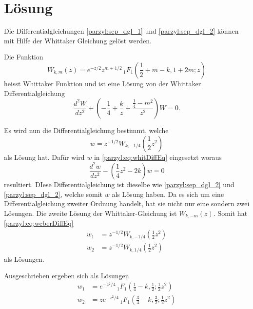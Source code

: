 %
%
%
\section{Lösung
\label{parzyl:section:teil1}}
Die Differentialgleichungen \eqref{parzyl:sep_dgl_1} und \eqref{parzyl:sep_dgl_2} können mit
Hilfe der Whittaker Gleichung gelöst werden.
\begin{definition}
    Die Funktion 
    \begin{equation*}
        W_{k,m}(z) = 
    e^{-z/2} z^{m+1/2} \,
    {}_{1} F_{1}
    (
        {\textstyle \frac{1}{2}} 
        + m - k, 1 + 2m; z)
    \end{equation*}
    heisst Whittaker Funktion und ist eine Lösung
    von der Whittaker Differentialgleichung
    \begin{equation}
        \frac{d^2W}{d z^2} +
        \left(-\frac{1}{4}  + \frac{k}{z} + \frac{\frac{1}{4} - m^2}{z^2} \right) W = 0.
        \label{parzyl:eq:whitDiffEq}
    \end{equation}
\end{definition}
Es wird nun die Differentialgleichung bestimmt, welche
\begin{equation}
    w = z^{-1/2} W_{k,-1/4} \left({\textstyle \frac{1}{2}} z^2\right)
\end{equation}
als Lösung hat.
Dafür wird $w$ in \eqref{parzyl:eq:whitDiffEq} eingesetzt woraus
\begin{equation}
    \frac{d^2 w}{dz^2} - \left(\frac{1}{4} z^2 - 2k\right) w = 0
\label{parzyl:eq:weberDiffEq}
\end{equation}
resultiert. DIese Differentialgleichung ist dieselbe wie 
\eqref{parzyl:sep_dgl_2} und \eqref{parzyl:sep_dgl_2}, welche somit
$w$ als Lösung haben.
Da es sich um eine Differentialgleichung zweiter Ordnung handelt, hat sie nicht nur
eine sondern zwei Lösungen.
Die zweite Lösung der Whittaker-Gleichung ist $W_{k,-m} (z)$.
Somit hat \eqref{parzyl:eq:weberDiffEq}
\begin{align}
    w_1 & = z^{-1/2} W_{k,-1/4} \left({\textstyle \frac{1}{2}} z^2\right)\\
    w_2 & = z^{-1/2} W_{k,1/4} \left({\textstyle \frac{1}{2}} z^2\right)
\end{align}
als Lösungen.

Ausgeschrieben ergeben sich als Lösungen
\begin{align}
	\label{parzyl:eq:solution_dgl}
    w_1 &= e^{-z^2/4} \,
    {}_{1} F_{1}
    (
        {\textstyle \frac{1}{4}} 
         - k, {\textstyle \frac{1}{2}} ; {\textstyle \frac{1}{2}}z^2) \\
    w_2 & = z e^{-z^2/4} \,
         {}_{1} F_{1}
         ({\textstyle \frac{3}{4}} 
              - k, {\textstyle \frac{3}{2}} ; {\textstyle \frac{1}{2}}z^2)
\end{align}
